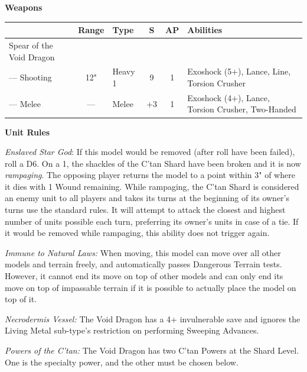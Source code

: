 \begin{minipage}[t]{0.72\textwidth}
	\vspace*{2em}
	\textbf{Weapons}
	
	\begin{tabular}{L{90 pt} c C{40pt} *{2}{c} >{\raggedright\arraybackslash}p{130pt}}
		& Range & Type & S & AP & Abilities \\
		\hline
		Spear of the Void Dragon & & & & & \\
		— Shooting & 12" & Heavy 1 & 9 & 1 & Exoshock (5+), Lance, Line, Torsion Crusher \\
		— Melee & — & Melee & +3 & 1 & Exoshock (4+), Lance, Torsion Crusher, Two-Handed \\
	\end{tabular}
	
	\vspace*{2em}
	\textbf{Unit Rules}
	
	\textit{Enslaved Star God}: If this model would be removed (after  roll have been failed), roll a D6. On a 1, the shackles of the C'tan Shard have been broken and it is now \textit{rampaging}. The opposing player returns the model to a point within 3" of where it dies with 1 Wound remaining. While rampaging, the C'tan Shard is considered an enemy unit to all players and takes its turns at the beginning of its owner's turns use the standard rules. It will attempt to attack the closest and highest number of units possible each turn, preferring its owner's units in case of a tie. If it would be removed while rampaging, this ability does not trigger again.
	
	\textit{Immune to Natural Laws:} When moving, this model can move over all other models and terrain freely, and automatically passes Dangerous Terrain tests. However, it cannot end its move on top of other models and can only end its move on top of impassable terrain if it is possible to actually place the model on top of it.
		
	\textit{Necrodermis Vessel:} The Void Dragon has a 4+ invulnerable save and ignores the Living Metal sub-type's restriction on performing Sweeping Advances.
	
	\textit{Powers of the C'tan:} The Void Dragon has two C'tan Powers at the Shard Level. One is the  specialty power, and the other must be chosen below.
	

\end{minipage}
